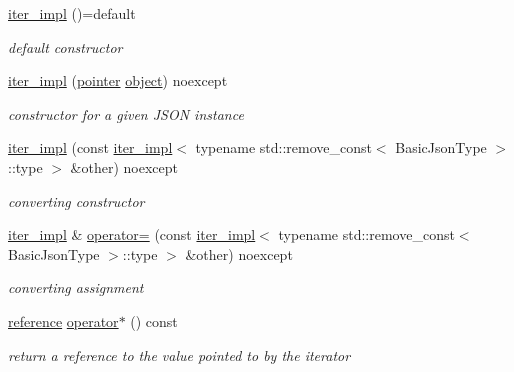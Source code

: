 \begin{DoxyCompactItemize}
\item 
\hyperlink{classnlohmann_1_1detail_1_1iter__impl_a19aa457f9c4af1b7e3af59839132cc5c}{iter\+\_\+impl} ()=default
\begin{DoxyCompactList}\small\item\em default constructor \end{DoxyCompactList}\item 
\hyperlink{classnlohmann_1_1detail_1_1iter__impl_a88a00484ac201c52fc5f613d88a2918b}{iter\+\_\+impl} (\hyperlink{classnlohmann_1_1detail_1_1iter__impl_a69e52f890ce8c556fd68ce109e24b360}{pointer} \hyperlink{namespacenlohmann_1_1detail_a1ed8fc6239da25abcaf681d30ace4985aa8cfde6331bd59eb2ac96f8911c4b666}{object}) noexcept
\begin{DoxyCompactList}\small\item\em constructor for a given J\+S\+ON instance \end{DoxyCompactList}\item 
\hyperlink{classnlohmann_1_1detail_1_1iter__impl_a867f7eb55091be31b013adb3e46816d3}{iter\+\_\+impl} (const \hyperlink{classnlohmann_1_1detail_1_1iter__impl}{iter\+\_\+impl}$<$ typename std\+::remove\+\_\+const$<$ Basic\+Json\+Type $>$\+::type $>$ \&other) noexcept
\begin{DoxyCompactList}\small\item\em converting constructor \end{DoxyCompactList}\item 
\hyperlink{classnlohmann_1_1detail_1_1iter__impl}{iter\+\_\+impl} \& \hyperlink{classnlohmann_1_1detail_1_1iter__impl_a7159ed1cfe7c423a2baef8bea0c94509}{operator=} (const \hyperlink{classnlohmann_1_1detail_1_1iter__impl}{iter\+\_\+impl}$<$ typename std\+::remove\+\_\+const$<$ Basic\+Json\+Type $>$\+::type $>$ \&other) noexcept
\begin{DoxyCompactList}\small\item\em converting assignment \end{DoxyCompactList}\item 
\hyperlink{classnlohmann_1_1detail_1_1iter__impl_a5be8001be099c6b82310f4d387b953ce}{reference} \hyperlink{classnlohmann_1_1detail_1_1iter__impl_a5ca57856d9bba54a5fc51cee891de827}{operator$\ast$} () const
\begin{DoxyCompactList}\small\item\em return a reference to the value pointed to by the iterator \end{DoxyCompactList}\item 

\end{DoxyCompactItemize}
